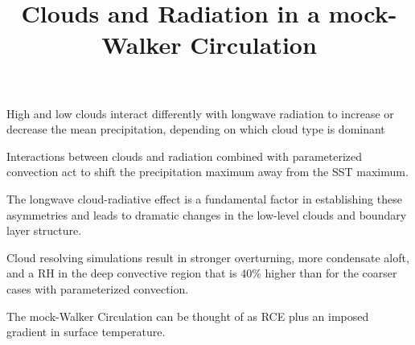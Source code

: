 \documentclass[draft]{agujournal2019}
\begin{document}
\title{Clouds and Radiation in a mock-Walker Circulation}


\begin{keypoints}
  \item{High and low clouds interact differently with longwave radiation to increase or decrease the mean precipitation, depending on which cloud type is dominant}
  \item{Interactions between clouds and radiation combined with parameterized convection act to shift the precipitation 
  maximum away from the SST maximum.}
  \item{The longwave cloud-radiative effect is a fundamental factor in establishing these asymmetries and leads to dramatic
  changes in the low-level clouds and boundary layer structure.}
  \item{Cloud resolving simulations result in stronger overturning, more condensate aloft, and a RH in the deep convective 
  region that is 40\% higher than for the coarser cases with parameterized convection.}
  \item{The mock-Walker Circulation can be thought of as RCE plus an imposed gradient in surface temperature.}
\end{keypoints}
\end{document}

